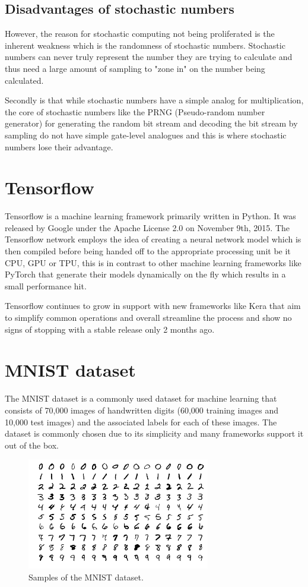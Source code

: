 \documentclass[a4paper,twoside,phd]{BYUPhys}
\begin{document}
\subsection{Disadvantages of stochastic numbers}
However, the reason for stochastic computing not being proliferated is the inherent weakness which is the randomness of stochastic numbers. Stochastic numbers can never truly represent the number they are trying to calculate and thus need a large amount of sampling to "zone in" on the number being calculated.

Secondly is that while stochastic numbers have a simple analog for multiplication, the core of stochastic numbers like the PRNG (Pseudo-random number generator) for generating the random bit stream and decoding the bit stream by sampling do not have simple gate-level analogues and this is where stochastic numbers lose their advantage.

\section{Tensorflow}
Tensorflow is a machine learning framework primarily written in Python. It was released by Google under the Apache License 2.0 on November 9th, 2015. The Tensorflow network employs the idea of creating a neural network model which is then compiled before being handed off to the appropriate processing unit be it CPU, GPU or TPU, this is in contrast to other machine learning frameworks like PyTorch that generate their models dynamically on the fly which results in a small performance hit.

Tensorflow continues to grow in support with new frameworks like Kera that aim to simplify common operations and overall streamline the process and show no signs of stopping with a stable release only 2 months ago.

\section{MNIST dataset}
The MNIST dataset is a commonly used dataset for machine learning that consists of 70,000 images of handwritten digits (60,000 training images and 10,000 test images) and the associated labels for each of these images. The dataset is commonly chosen due to its simplicity and many frameworks support it out of the box.
\begin{figure}[H]
\centering
\includegraphics[width=8cm]{pictures/mnist.png}
\caption{Samples of the MNIST dataset.}
\label{fig:mnist}
\end{figure}
\end{document}

